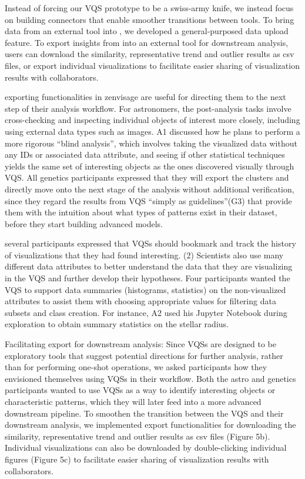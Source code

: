  \par Instead of forcing our VQS prototype to be a swiss-army knife, we instead focus on building connectors that enable smoother transitions between tools. To bring data from an external tool into \zvpp, we developed a general-purposed data upload feature. To export insights from \zvpp into an external tool for downstream analysis, users can download the similarity, representative trend and outlier results as csv files, or export individual visualizations to facilitate easier sharing of visualization results with collaborators.


  exporting functionalities in zenvisage are useful for directing them to the next step of their analysis workflow. For astronomers, the post-analysis tasks involve cross-checking and inspecting individual objects of interest more closely, including using external data types such as images. A1 discussed how he plans to perform a more rigorous “blind analysis”, which involves taking the visualized data without any IDs or associated data attribute, and seeing if other statistical techniques yields the same set of interesting objects as the ones discovered visually through VQS. All genetics participants expressed that they will export the clusters and directly move onto the next stage of the analysis without additional verification, since they regard the results from VQS “simply as guidelines”(G3) that provide them with the intuition about what types of patterns exist in their dataset, before they start building advanced models. 

  several participants expressed that VQSs should bookmark and track the history of visualizations that they had found interesting. (2) Scientists also use many different data attributes to better understand the data that they are visualizing in the VQS and further develop their hypotheses. Four participants wanted the VQS to support data summaries (histograms, statistics) on the non-visualized attributes to assist them with choosing appropriate values for filtering data subsets and class creation. For instance, A2 used his Jupyter Notebook during exploration to obtain summary statistics on the stellar radius.



Facilitating export for downstream analysis: Since VQSs are designed to be exploratory tools that suggest potential directions for further analysis, rather than for performing one-shot operations, we asked participants how they envisioned themselves using VQSs in their workflow. Both the astro and genetics participants wanted to use VQSs as a way to identify interesting objects or characteristic patterns, which they will later feed into a more advanced downstream pipeline.
To smoothen the transition between the VQS and their downstream analysis, we implemented export functionalities for downloading the similarity, representative trend and outlier results as csv files (Figure 5b). Individual visualizations can also be downloaded by double-clicking individual figures (Figure 5c) to facilitate easier
sharing of visualization results with collaborators.

